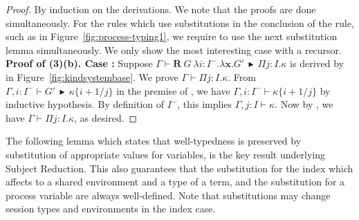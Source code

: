 \documentclass{LMCS}
\newcommand{\RECSEQP}[4]{\ensuremath{\mathbf{R} \ #1\ \lambda #2.\lambda #3.#4}}
\newcommand{\subst}[2]{\ensuremath{\{#1 / #2\}}}
\newcommand{\G}{\ensuremath{G}}
\newcommand{\trule}[1]{\text{\footnotesize{\ensuremath{\lfloor\text{\sc{#1}}\rfloor}}}}
\newcommand{\tftrule}[1]{{\text{\footnotesize[\text{\sc{#1}}]}}}
\newcommand{\GR}[4]{\RECSEQP{#1}{#2}{#3}{#4}}
\newcommand{\ii}{\ensuremath{i}}
\newcommand{\jj}{\ensuremath{j}}
\newcommand{\xx}{\ensuremath{\mathbf{x}}}
\newcommand{\II}{\ensuremath{I}}
\newcommand{\K}{\ensuremath{\kappa}}
\newcommand{\RHD}{\,\ensuremath{\blacktriangleright}\,}
\newcommand{\AT}[2]{#1\! : \! #2}
\begin{document}
\begin{proof}
By induction on the derivations. We note that the proofs are 
done simultaneously.  For the rules which use substitutions 
in the conclusion of the rule, such as \tftrule{TApp} in
Figure~\ref{fig:process-typing1}, 
we require to use the next substitution lemma simultaneously. 
We only show the most interesting case 
with a recursor. \\[1mm]
{\bf Proof of (3)(b). Case \trule{KRcr}:}  Suppose 
$\Gamma \vdash \GR{\G}{\AT{\ii}{\II^-}}{\xx}{\G'}  
\RHD \Pi\AT{\jj}{\II}. \K$ is derived by \trule{KRcr} in 
Figure~\ref{fig:kindsystembase}.  We prove $\Gamma \vdash  
\Pi\AT{\jj}{\II}. \K$. 
From $\Gamma, \ii:\II^- \vdash \G' \RHD \K\subst{i+1}{j}$ in the
premise of \trule{KRcr}, 
we have $\Gamma, \ii:\II^- \vdash \K\subst{i+1}{j}$ by inductive
hypothesis.  By definition of $\II^-$, this implies 
$\Gamma, \jj:\II \vdash \K$. Now by  \trule{KSeq}, 
we have $\Gamma\vdash \Pi\AT{\jj}{\II}.\K$, as desired. 
\end{proof}
The following lemma which states that well-typedness is
preserved by substitution of appropriate values for variables, is the
key result underlying Subject Reduction. This also guarantees that 
the substitution for the index which affects to a shared environment and
a type of a term, and the substitution for a process variable are
always well-defined.  
Note that 
substitutions may change session types and environments in the index case.
\newpage
\end{document}
